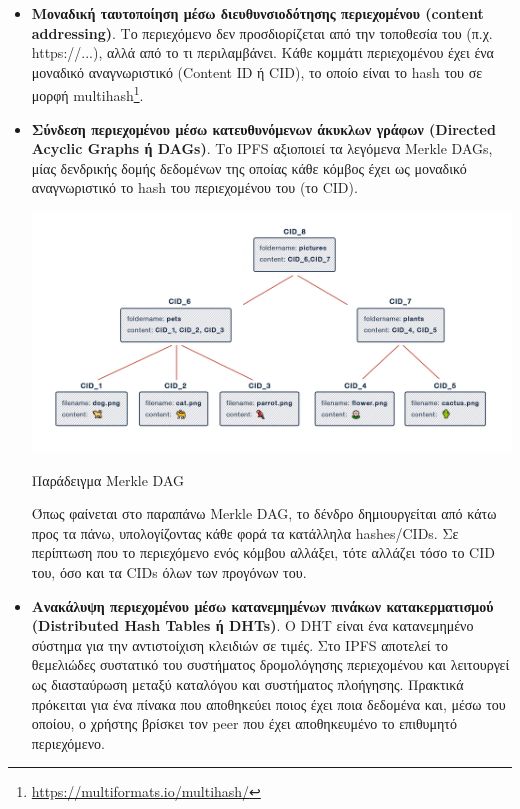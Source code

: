 \begin{itemize}
	\item \textbf{Μοναδική ταυτοποίηση μέσω διευθυνσιοδότησης περιεχομένου (content addressing)}. Το περιεχόμενο δεν προσδιορίζεται από την τοποθεσία του (π.χ. https://...), αλλά από το τι περιλαμβάνει. Κάθε κομμάτι περιεχομένου έχει ένα μοναδικό αναγνωριστικό (Content ID ή CID), το οποίο είναι το hash του σε μορφή multihash\footnote{\url{https://multiformats.io/multihash/}}.
	\item \textbf{Σύνδεση περιεχομένου μέσω κατευθυνόμενων άκυκλων γράφων (Directed Acyclic Graphs ή DAGs)}. Το IPFS αξιοποιεί τα λεγόμενα Merkle DAGs, μίας δενδρικής δομής δεδομένων της οποίας κάθε κόμβος έχει ως μοναδικό αναγνωριστικό το hash του περιεχομένου του (το CID).

	\begin{enumitemcenteredfigure}
		\includegraphics[width=\textwidth]{assets/figures/chapter-2/2.7.merkle-dag.png}
		\caption[Παράδειγμα Merkle DAG]{Παράδειγμα Merkle DAG\footnotemark}
	\end{enumitemcenteredfigure}

	Όπως φαίνεται στο παραπάνω Merkle DAG, το δένδρο δημιουργείται από κάτω προς τα πάνω, υπολογίζοντας κάθε φορά τα κατάλληλα hashes/CIDs. Σε περίπτωση που το περιεχόμενο ενός κόμβου αλλάξει, τότε αλλάζει τόσο το CID του, όσο και τα CIDs όλων των προγόνων του.
	\item \textbf{Ανακάλυψη περιεχομένου μέσω κατανεμημένων πινάκων κατακερματισμού (\textenglish{Distributed Hash Tables ή DHTs})}. Ο DHT είναι ένα κατανεμημένο σύστημα για την αντιστοίχιση κλειδιών σε τιμές. Στο IPFS αποτελεί το θεμελιώδες συστατικό του συστήματος δρομολόγησης περιεχομένου και λειτουργεί ως διασταύρωση μεταξύ καταλόγου και συστήματος πλοήγησης. Πρακτικά πρόκειται για ένα πίνακα που αποθηκεύει ποιος έχει ποια δεδομένα και, μέσω του οποίου, ο χρήστης βρίσκει τον peer που έχει αποθηκευμένο το επιθυμητό περιεχόμενο.
\end{itemize}

